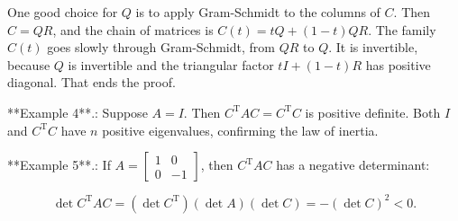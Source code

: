 One good choice for \(Q\) is to apply Gram-Schmidt to the columns of \(C\). Then \(C=QR\), and the chain of matrices is \(C(t)=tQ+(1-t)QR\). The family \(C(t)\) goes slowly through Gram-Schmidt, from \(QR\) to \(Q\). It is invertible, because \(Q\) is invertible and the triangular factor \(tI+(1-t)R\) has positive diagonal. That ends the proof. 

**Example 4**.: Suppose \(A=I\). Then \(C^{\mathrm{T}}AC=C^{\mathrm{T}}C\) is positive definite. Both \(I\) and \(C^{\mathrm{T}}C\) have \(n\) positive eigenvalues, confirming the law of inertia.

**Example 5**.: If \(A=\left[\begin{smallmatrix}1&0\\ 0&-1\end{smallmatrix}\right]\), then \(C^{\mathrm{T}}AC\) has a negative determinant:

\[\det C^{\mathrm{T}}AC=(\det C^{\mathrm{T}})(\det A)(\det C)=-(\det C)^{2}<0.\]